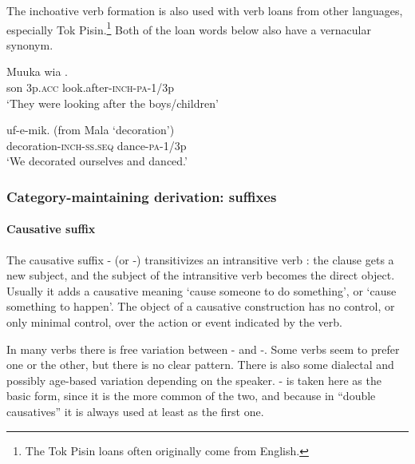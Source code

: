 The inchoative verb formation is also used with verb loans from other languages, especially Tok Pisin.\footnote{The Tok Pisin loans often originally come from English.} Both of the loan words below also have a vernacular synonym.

\ea%
\label{ex:x487}
\gll Muuka wia .   \\
son 3p.\textsc{acc} look.after-\textsc{inch}-\textsc{pa}-1/3p\\
\glt`They were looking after the boys/children'
\z

\ea%
\label{ex:x488}
\gll {} uf-e-mik. (from Mala  `decoration') \\
decoration-\textsc{inch}-\textsc{ss}.\textsc{seq} dance-\textsc{pa}-1/3p\\
\glt`We decorated ourselves and danced.'
\z

\subsubsection[Category-maintaining derivation: suffixes]{Category-maintaining derivation: suffixes}
{}
\paragraph[Causative suffix]{Causative suffix}
{}
The causative suffix \nobreakdash- (or \nobreakdash-) transitivizes an intransitive verb \citep[2]{Peterson2007}: the clause gets a new subject, and the subject of the intransitive verb becomes the direct object. Usually it adds a causative meaning `cause someone to do something', or `cause something to happen'. The object of a causative construction has no control, or only minimal control, over the action or event indicated by the verb.

In many verbs there is free variation between \nobreakdash- and \nobreakdash-. Some verbs seem to prefer one or the other, but there is no clear pattern. There is also some dialectal and possibly age-based variation depending on the speaker. \nobreakdash- is taken here as the basic form, since it is the more common of the two, and because in ``double causatives'' it is always used at least as the first one. 

